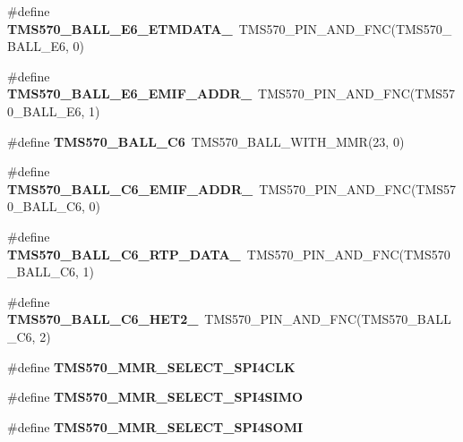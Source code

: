 \begin{DoxyCompactItemize}
\mbox{\label{tms570ls3137zwt-pins_8h_a5279aa45bd5c7bd31db6da14a9242fad}} 
\#define {\bfseries T\+M\+S570\+\_\+\+B\+A\+L\+L\+\_\+\+E6\+\_\+\+E\+T\+M\+D\+A\+T\+A\+\_}~T\+M\+S570\+\_\+\+P\+I\+N\+\_\+\+A\+N\+D\+\_\+\+F\+NC(T\+M\+S570\+\_\+\+B\+A\+L\+L\+\_\+\+E6, 0)
\item 
\mbox{\label{tms570ls3137zwt-pins_8h_a8fb500c618d8733fe77e1f837617bba5}} 
\#define {\bfseries T\+M\+S570\+\_\+\+B\+A\+L\+L\+\_\+\+E6\+\_\+\+E\+M\+I\+F\+\_\+\+A\+D\+D\+R\+\_}~T\+M\+S570\+\_\+\+P\+I\+N\+\_\+\+A\+N\+D\+\_\+\+F\+NC(T\+M\+S570\+\_\+\+B\+A\+L\+L\+\_\+\+E6, 1)
\item 
\mbox{\label{tms570ls3137zwt-pins_8h_a8b858d9ca66ef31be67bfb92802782b2}} 
\#define {\bfseries T\+M\+S570\+\_\+\+B\+A\+L\+L\+\_\+\+C6}~T\+M\+S570\+\_\+\+B\+A\+L\+L\+\_\+\+W\+I\+T\+H\+\_\+\+M\+MR(23, 0)
\item 
\mbox{\label{tms570ls3137zwt-pins_8h_aeb2378c5e9b4e8e5211154882b290341}} 
\#define {\bfseries T\+M\+S570\+\_\+\+B\+A\+L\+L\+\_\+\+C6\+\_\+\+E\+M\+I\+F\+\_\+\+A\+D\+D\+R\+\_}~T\+M\+S570\+\_\+\+P\+I\+N\+\_\+\+A\+N\+D\+\_\+\+F\+NC(T\+M\+S570\+\_\+\+B\+A\+L\+L\+\_\+\+C6, 0)
\item 
\mbox{\label{tms570ls3137zwt-pins_8h_a60500402fbf682187d6538881f28f751}} 
\#define {\bfseries T\+M\+S570\+\_\+\+B\+A\+L\+L\+\_\+\+C6\+\_\+\+R\+T\+P\+\_\+\+D\+A\+T\+A\+\_}~T\+M\+S570\+\_\+\+P\+I\+N\+\_\+\+A\+N\+D\+\_\+\+F\+NC(T\+M\+S570\+\_\+\+B\+A\+L\+L\+\_\+\+C6, 1)
\item 
\mbox{\label{tms570ls3137zwt-pins_8h_afc4d1ae964f0ba415309f51a86054b73}} 
\#define {\bfseries T\+M\+S570\+\_\+\+B\+A\+L\+L\+\_\+\+C6\+\_\+\+H\+E\+T2\+\_}~T\+M\+S570\+\_\+\+P\+I\+N\+\_\+\+A\+N\+D\+\_\+\+F\+NC(T\+M\+S570\+\_\+\+B\+A\+L\+L\+\_\+\+C6, 2)
\item 
\#define {\bfseries T\+M\+S570\+\_\+\+M\+M\+R\+\_\+\+S\+E\+L\+E\+C\+T\+\_\+\+S\+P\+I4\+C\+LK}
\item 
\#define {\bfseries T\+M\+S570\+\_\+\+M\+M\+R\+\_\+\+S\+E\+L\+E\+C\+T\+\_\+\+S\+P\+I4\+S\+I\+MO}
\item 
\#define {\bfseries T\+M\+S570\+\_\+\+M\+M\+R\+\_\+\+S\+E\+L\+E\+C\+T\+\_\+\+S\+P\+I4\+S\+O\+MI}

\end{DoxyCompactItemize}
